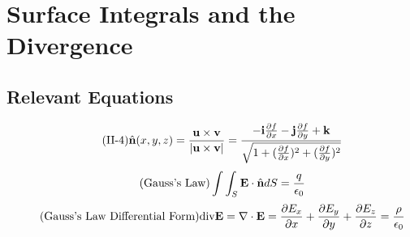 \documentclass{article}
\begin{document}
\section{Surface Integrals and the Divergence}
\subsection*{Relevant Equations}
    \begin{equation}\tag{II-4}
        \hat{\textbf{n}}(x,y,z) = \frac{\textbf{u} \times \textbf{v}}{|\textbf{u} \times \textbf{v}|} = \frac{-\textbf{i}\frac{\partial{f}}{\partial{x}} -\textbf{j}\frac{\partial{f}}{\partial{y}} + \textbf{k}} {\sqrt{1 + (\frac{\partial{f}}{\partial{x}})^2 + (\frac{\partial{f}}{\partial{y}})^2 }}
    \end{equation}
    \begin{equation}\tag{Gauss's Law}
        \int\int_S \textbf{E} \cdot \hat{\textbf{n}} dS = \frac{q}{\epsilon_0}
    \end{equation}
    \begin{equation}\tag{Gauss's Law Differential Form}
        \textnormal{div} \textbf{E} = \nabla \cdot \textbf{E} = \frac{\partial{E_x}}{\partial{x}} + \frac{\partial{E_y}}{\partial{y}} + \frac{\partial{E_z}}{\partial{z}} = \frac{\rho}{\epsilon_0}
    \end{equation}
\end{document}

